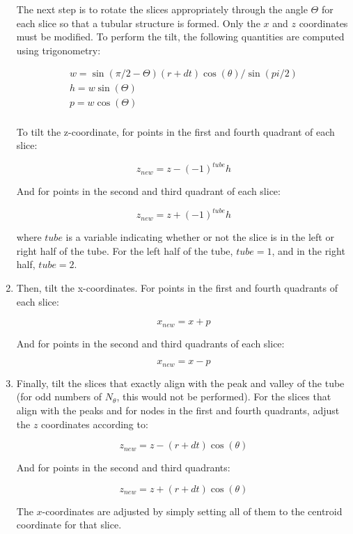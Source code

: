 \documentclass[10pt]{article}
\begin{document}
\begin{enumerate}
The next step is to rotate the slices appropriately through the angle \(\Theta\) for each slice so that a tubular structure is formed. Only the \(x\) and \(z\) coordinates must be modified. To perform the tilt, the following quantities are computed using trigonometry:

\begin{equation}
\begin{aligned}
w=\sin{(\pi/2-\Theta)}(r+dt)\cos{(\theta)}/\sin{(pi/2)}\\
h = w\sin{(\Theta)}\\
p = w\cos{(\Theta)}\\
\end{aligned}
\end{equation}

To tilt the z-coordinate, for points in the first and fourth quadrant of each slice:

\begin{equation}
z_{new} = z - (-1)^{tube}h
\end{equation}

And for points in the second and third quadrant of each slice:

\begin{equation}
z_{new} = z + (-1)^{tube}h
\end{equation}

where \(tube\) is a variable indicating whether or not the slice is in the left or right half of the tube. For the left half of the tube, \(tube=1\), and in the right half, \(tube=2\).

\item Then, tilt the x-coordinates. For points in the first and fourth quadrants of each slice:

\begin{equation}
x_{new} = x + p
\end{equation}

And for points in the second and third quadrants of each slice:

\begin{equation}
x_{new} = x - p
\end{equation}

\item Finally, tilt the slices that exactly align with the peak and valley of the tube (for odd numbers of \(N_\theta\), this would not be performed). For the slices that align with the peaks and for nodes in the first and fourth quadrants, adjust the \(z\) coordinates according to:

\begin{equation}
z_{new} = z - (r+dt)\cos{(\theta)}
\end{equation}

And for points in the second and third quadrants:

\begin{equation}
z_{new} = z + (r+dt)\cos{(\theta)}
\end{equation}

The \(x\)-coordinates are adjusted by simply setting all of them to the centroid coordinate for that slice. 
\end{enumerate}
\end{document}
